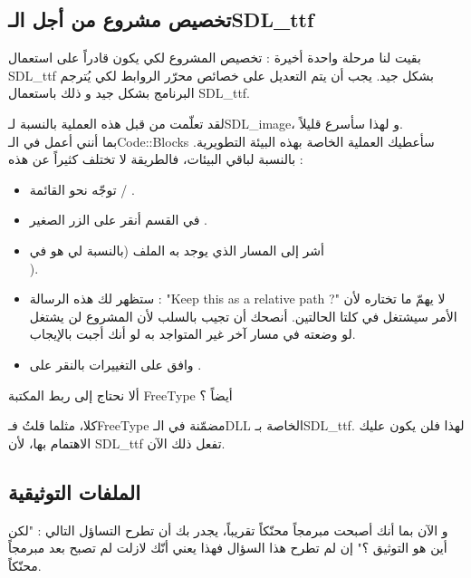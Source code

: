 \subsection{تخصيص مشروع من أجل الـ\textenglish{SDL\_ttf}}

بقيت لنا مرحلة واحدة أخيرة : تخصيص المشروع لكي يكون قادراً على استعمال
\textenglish{SDL\_ttf}
بشكل جيد. يجب أن يتم التعديل على خصائص محرّر الروابط لكي يُترجم البرنامج بشكل جيد و ذلك باستعمال
\textenglish{SDL\_ttf}.

لقد تعلّمت من قبل هذه العملية بالنسبة لـ\textenglish{SDL\_image}،
و لهذا سأسرع قليلاً. \\
بما أنني أعمل في الـ\textenglish{Code::Blocks}
سأعطيك العملية الخاصة بهذه البيئة التطويرية. بالنسبة لباقي البيئات، فالطريقة لا تختلف كثيراً عن هذه :

\begin{itemize}
	\item توجّه نحو القائمة
	 / .
	\item في القسم
	أنقر على الزر الصغير
	.
	\item أشر إلى المسار الذي يوجد به الملف
	(بالنسبة لي هو في\\
	).
	\item ستظهر لك هذه الرسالة :
	"\textenglish{Keep this as a relative path ?}"
	لا يهمّ ما تختاره لأن الأمر سيشتغل في كلتا الحالتين. أنصحك أن تجيب بالسلب لأن المشروع لن يشتغل لو وضعته في مسار آخر غير المتواجد به لو أنك أجبت بالإيجاب.
	\item وافق على التغييرات بالنقر على 
	.
\end{itemize}

\begin{question}
ألا نحتاج إلى ربط المكتبة
\textenglish{FreeType}
أيضاً ؟
\end{question}

كلا، مثلما قلتُ فـ\textenglish{FreeType}
مضمّنة في الـ\textenglish{DLL}
الخاصة بـ\textenglish{SDL\_ttf}.
لهذا فلن يكون عليك الاهتمام بها، لأن
\textenglish{SDL\_ttf}
تفعل ذلك الآن.
\subsection{الملفات التوثيقية}

و الآن بما أنك أصبحت مبرمجاً محنّكاً تقريباً، يجدر بك أن تطرح التساؤل التالي : "لكن أين هو التوثيق ؟" إن لم تطرح هذا السؤال فهذا يعني أنّك لازلت لم تصبح بعد مبرمجاً محنّكاً.

